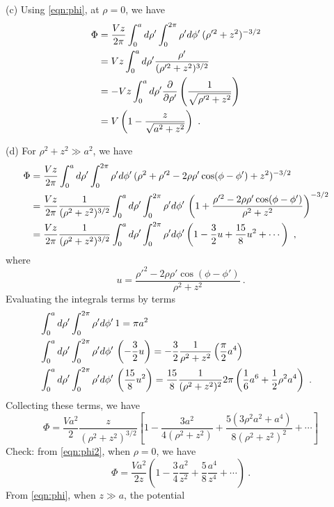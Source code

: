\documentclass[12pt]{article}
\begin{document}
\newpage
{} (c) Using \eqref{eqn:phi}, at $\rho = 0$, we have
\begin{align}
    \Phi &= \frac{Vz}{2\pi} \int_0^a d\rho' \int_0^{2\pi} \rho' d \phi' \, ( \rho'^2 + z^2)^{-3/2}\cr
    &= Vz \int_0^a d\rho' \frac{\rho'}{(\rho'^2 + z^2)^{3/2}} \cr
    & = - Vz \int_0^a d \rho' \frac{\partial}{\partial \rho'} \left(\frac{1}{\sqrt{\rho'^2 + z^2} }\right)\cr
    & = V \left(1 - \frac{z}{\sqrt{a^2 + z^2}}\right)~.
\end{align}

\newpage
{} (d) For $\rho^2 + z^2 \gg a^2$, we have
\begin{align}
    \Phi &=  \frac{Vz}{2\pi} \int_0^a d\rho' \int_0^{2\pi} \rho' d \phi' \, (\rho ^2 + \rho'^2 - 2\rho \rho' \cos(\phi - \phi') + z^2)^{-3/2}\cr
    &=\frac{Vz}{2\pi} \frac{1}{(\rho^2 + z^2)^{3/2}} \int_0^a d\rho'\int_0^{2\pi} \rho' d \phi' \, \left(1+ \frac{\rho'^2 - 2\rho \rho' \cos(\phi - \phi')}{\rho^2 + z^2}\right)^{-3/2} \cr
    & = \frac{Vz}{2\pi} \frac{1}{(\rho^2 + z^2)^{3/2}} \int_0^a d\rho' \int_0^{2\pi} \rho' d\phi' \left(1 - \frac32 u + \frac{15}{8} u^2+ \cdots\right)~,
\end{align}
where
\begin{equation}
    u = \frac{\rho'^2 - 2\rho \rho' \cos(\phi - \phi')}{\rho^2 + z^2}~.
\end{equation}
Evaluating the integrals terms by terms
\begin{align}
    &\int_0^a d \rho' \int_0^{2\pi} \rho' d \phi'\, 1 = \pi a^2 \cr
    &\int_0^a d \rho' \int_0^{2\pi} \rho' d \phi'\, \left(-\frac32 u\right)= -\frac32 \frac{1}{\rho^2 + z^2} \left(\frac{\pi}{2}a^4\right)\cr
    &\int_0^a d \rho' \int_0^{2\pi} \rho' d \phi'\, \left(\frac{15}{8} u^2\right)= \frac{15}{8} \frac{1}{(\rho^2 + z^2)^2}  2\pi \left( \frac16 a^6 + \frac 12 \rho^2 a^4\right)~.
\end{align}
Collecting these terms, we have
\begin{equation} \label{eqn:phi2}
    \Phi = \frac{Va^2}{2} \frac{z}{(\rho^2 + z^2)^{3/2}} \left[1 - \frac{3a^2}{4(\rho^2 + z^2)} + \frac{5(3\rho^2 a^2 + a^4)}{8(\rho^2 + z^2)^2} + \cdots\right]
\end{equation}
Check: from \eqref{eqn:phi2}, when $\rho = 0$, we have
\begin{equation} \label{eqn:check}
    \Phi = \frac{Va^2}{2z} \left( 1- \frac34 \frac{a^2}{z^2} + \frac{5}{8} \frac{a^4}{z^4} + \cdots \right)~.
\end{equation}
From \eqref{eqn:phi}, when $z \gg a$, the potential
\end{document}
